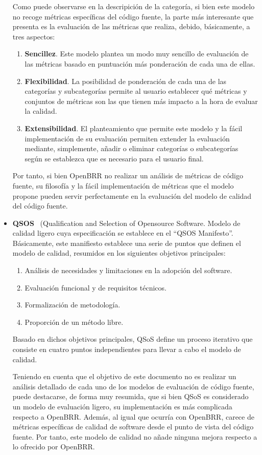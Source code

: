 \documentclass[11pt]{article}
\begin{document}
\begin{itemize}
Como puede observarse en la descripición de la categoría, si bien este modelo no recoge métricas específicas del código fuente, la parte más interesante que presenta es la evaluación de las métricas que realiza, debido, básicamente, a tres aspectos:
\begin{enumerate}
\item{\textbf{Sencillez}}. Este modelo plantea un modo muy sencillo de evaluación de las métricas basado en puntuación más ponderación de cada una de ellas.
\item{\textbf{Flexibilidad}}. La posibilidad de ponderación de cada una de las categorías y subcategorías permite al usuario establecer qué métricas y conjuntos de métricas son las que tienen más impacto a la hora de evaluar la calidad.
\item{\textbf{Extensibilidad}}. El planteamiento que permite este modelo y la fácil implementación de su evaluación permiten extender la evaluación mediante, simplemente, añadir o eliminar categorías o subcategorías según se establezca que es necesario para el usuario final.
\end{enumerate}

Por tanto, si bien OpenBRR no realizar un análisis de métricas de código fuente, su filosofía y la fácil implementación de métricas que el modelo propone pueden servir perfectamente en la evaluación del modelo de calidad del código fuente.

\item{\textbf{QSOS}~\cite{qsos:qsos} (Qualification and Selection of Opensource Software}. Modelo de calidad ligero cuya especificación se establece en el ``QSOS Manifesto''. Básicamente, este manifiesto establece una serie de puntos que definen el modelo de calidad, resumidos en los siguientes objetivos principales:
\begin{enumerate}
\item{Análisis de necesidades y limitaciones en la adopción del software}.
\item{Evaluación funcional y de requisitos técnicos}.
\item{Formalización de metodología}.
\item{Proporción de un método libre}.
\end{enumerate}
Basado en dichos objetivos principales, QSoS define un proceso iterativo que consiste en cuatro puntos independientes para llevar a cabo el modelo de calidad.

Teniendo en cuenta que el objetivo de este documento no es realizar un análisis detallado de cada uno de los modelos de evaluación de código fuente, puede destacarse, de forma muy resumida, que si bien QSoS es considerado un modelo de evaluación ligero, su implementación es más complicada respecto a OpenBRR. Además, al igual que ocurría con OpenBRR, carece de métricas específicas de calidad de software desde el punto de vista del código fuente. Por tanto, este modelo de calidad no añade ninguna mejora respecto a lo ofrecido por OpenBRR.
\end{itemize}
\end{document}
